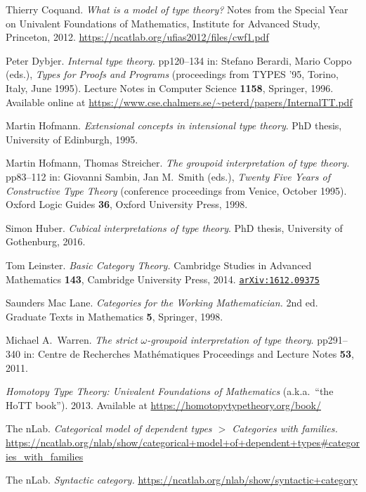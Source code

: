 \documentclass{article}
\theoremstyle{definition}
\begin{document}
\begin{thebibliography}{9}

 Thierry Coquand. \textit{What is a model of type theory?} Notes from the Special Year on Univalent Foundations of Mathematics, Institute for Advanced Study, Princeton, 2012. \url{https://ncatlab.org/ufias2012/files/cwf1.pdf}

 Peter Dybjer. \textit{Internal type theory.} pp120--134 in: Stefano Berardi, Mario Coppo (eds.), \textit{Types for Proofs and Programs} (proceedings from TYPES '95, Torino, Italy, June 1995). Lecture Notes in Computer Science \textbf{1158}, Springer, 1996. Available online at \url{https://www.cse.chalmers.se/~peterd/papers/InternalTT.pdf}

 Martin Hofmann. \textit{Extensional concepts in intensional type theory}. PhD thesis, University of Edinburgh, 1995.

 Martin Hofmann, Thomas Streicher. \textit{The groupoid interpretation of type theory.} pp83--112 in: Giovanni Sambin, Jan M.\ Smith (eds.), \textit{Twenty Five Years of Constructive Type Theory} (conference proceedings from Venice, October 1995). Oxford Logic Guides \textbf{36}, Oxford University Press, 1998.

 Simon Huber. \textit{Cubical interpretations of
type theory}. PhD thesis, University of Gothenburg, 2016.

 Tom Leinster. \textit{Basic Category Theory.} Cambridge Studies in Advanced Mathematics \textbf{143}, Cambridge University Press, 2014. \href{https://arxiv.org/abs/1612.09375}{\texttt{arXiv:1612.09375}}

 Saunders Mac Lane. \textit{Categories for the Working Mathematician.} 2nd ed. Graduate Texts in Mathematics \textbf{5}, Springer, 1998.

 Michael A.\ Warren. \textit{The strict $\omega$-groupoid interpretation of type theory}. pp291--340 in: Centre de Recherches Math\'ematiques Proceedings and Lecture Notes \textbf{53}, 2011.

 \textit{Homotopy Type Theory:
Univalent Foundations of Mathematics} (a.k.a.\ ``the HoTT book''). 2013. Available at \url{https://homotopytypetheory.org/book/}

 The nLab. \textit{Categorical model of dependent types $>$ Categories with families.} \url{https://ncatlab.org/nlab/show/categorical+model+of+dependent+types#categories_with_families}

 The nLab. \textit{Syntactic category.} \url{https://ncatlab.org/nlab/show/syntactic+category}
\end{thebibliography}
\end{document}
